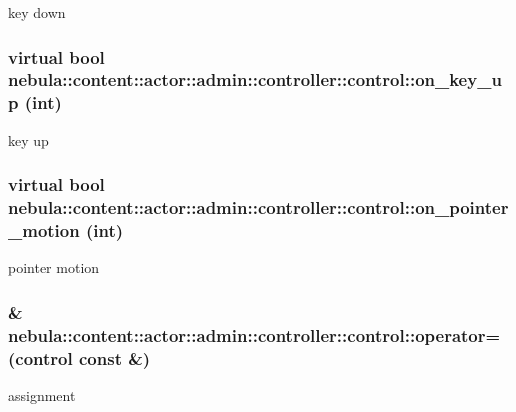 key down \hypertarget{classnebula_1_1content_1_1actor_1_1admin_1_1controller_1_1control_ad8f985adf1dd2cf49f2643796754c9c7}{
\subsubsection[{on\_\-key\_\-up}]{\setlength{\rightskip}{0pt plus 5cm}virtual bool nebula::content::actor::admin::controller::control::on\_\-key\_\-up (int)}}
\label{classnebula_1_1content_1_1actor_1_1admin_1_1controller_1_1control_ad8f985adf1dd2cf49f2643796754c9c7}


key up \hypertarget{classnebula_1_1content_1_1actor_1_1admin_1_1controller_1_1control_af5dda210df101e72817d807a1ea0fc82}{
\subsubsection[{on\_\-pointer\_\-motion}]{\setlength{\rightskip}{0pt plus 5cm}virtual bool nebula::content::actor::admin::controller::control::on\_\-pointer\_\-motion (int)}}
\label{classnebula_1_1content_1_1actor_1_1admin_1_1controller_1_1control_af5dda210df101e72817d807a1ea0fc82}


pointer motion \hypertarget{classnebula_1_1content_1_1actor_1_1admin_1_1controller_1_1control_a11020fb3848201c6b53f0be03e042d85}{
\subsubsection[{operator=}]{\& nebula::content::actor::admin::controller::control::operator= ({\bf control} const \&)}}
\label{classnebula_1_1content_1_1actor_1_1admin_1_1controller_1_1control_a11020fb3848201c6b53f0be03e042d85}
assignment 

